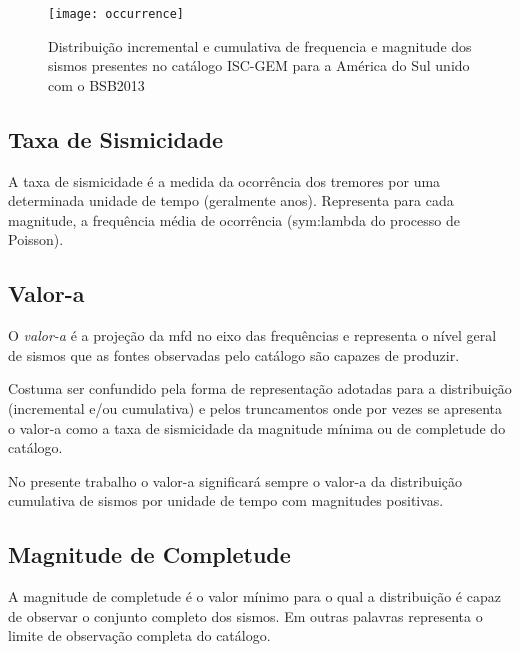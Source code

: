 \begin{figure}[H]
   \centering
   \texttt{[image: occurrence]}
   \caption[Distribuição incremental e cumulativa de frequencia e magnitude dos sismos presentes no catálogo ISC-GEM
   para a América do Sul unido com o BSB2013]
   {Distribuição incremental e cumulativa de frequencia e magnitude dos sismos presentes no catálogo ISC-GEM
   para a América do Sul unido com o BSB2013} 
   \label{f:occurrence}
\end{figure} 
 




\subsection{Taxa de Sismicidade}
\label{sec:seismic_rate}

A taxa de sismicidade é a medida da ocorrência dos tremores por uma determinada unidade de tempo (geralmente anos).
Representa para cada magnitude, a frequência média de ocorrência (\gls{sym:lambda} do processo de Poisson).

\subsection{Valor-a}
\label{sec:a_value}

O \emph{valor-a} é a projeção da \gls{mfd} no eixo das frequências e representa o nível geral de sismos
que as fontes observadas pelo catálogo são capazes de produzir.

Costuma ser confundido pela forma de representação adotadas para a distribuição (incremental e/ou
cumulativa) e pelos truncamentos onde por vezes se apresenta o valor-a como a taxa de sismicidade da 
magnitude mínima ou de completude do catálogo.

No presente trabalho o valor-a significará sempre o valor-a da distribuição cumulativa de sismos por unidade de tempo
com magnitudes positivas.

\subsection{Magnitude de Completude}
\label{sec:completeness}

A magnitude de completude é o valor mínimo para o qual a distribuição é capaz de observar o conjunto completo dos
sismos. Em outras palavras representa o limite de observação completa do catálogo.


